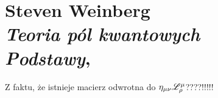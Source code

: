 \documentclass[a4paper,11pt]{article}
\numberwithin{equation}{section}
\begin{document}
\section{Steven Weinberg \\
  \textit{Teoria pól kwantowych} \\
  \textit{Podstawy},
  \cite{WeinbergTeoriaPolKwantowychPodstawy2012}}


\vspace{0em}



\vspace{0em}


\noindent
{} Z faktu, że istnieje macierz odwrotna do
$\eta_{ \mu \nu } \mathcal{L}^{ \mu }_{ \rho }$????!!!!!





\end{document}
